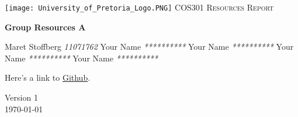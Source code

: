 \begin{titlepage}
\begin{center}
\texttt{[image: University\_of\_Pretoria\_Logo.PNG]}\newline
\textsc{\LARGE COS301 Resources Report}\newline


\textbf{Group Resources A} \\
\begin{flushright} \large
Maret Stoffberg \emph{11071762} \newline
Your Name \emph{**********} \newline
Your Name \emph{**********} \newline
Your Name \emph{**********} \newline
Your Name \emph{**********} \newline \newline \newline
\end{flushright}
Here's a link to \href{https://github.com/MaretStoffberg/COS301_phase3_ResourcesA}{Github}.


\vfill

{\large Version 1}
\\
{\large \today}

\end{center}
\end{titlepage}
